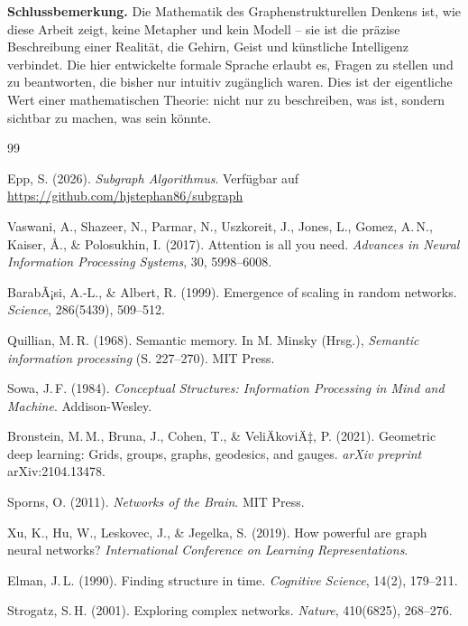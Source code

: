 ﻿\documentclass[12pt,a4paper]{article}
\theoremstyle{plain}
\theoremstyle{definition}
\theoremstyle{remark}
\begin{document}
\textbf{Schlussbemerkung.} Die Mathematik des Graphenstrukturellen Denkens ist, wie diese Arbeit zeigt, keine Metapher und kein Modell -- sie ist die präzise Beschreibung einer Realität, die Gehirn, Geist und künstliche Intelligenz verbindet. Die hier entwickelte formale Sprache erlaubt es, Fragen zu stellen und zu beantworten, die bisher nur intuitiv zugänglich waren. Dies ist der eigentliche Wert einer mathematischen Theorie: nicht nur zu beschreiben, was ist, sondern sichtbar zu machen, was sein könnte.

\begin{thebibliography}{99}

Epp, S. (2026).
\textit{Subgraph Algorithmus}. Verfügbar auf \url{https://github.com/hjstephan86/subgraph}

Vaswani, A., Shazeer, N., Parmar, N., Uszkoreit, J., Jones, L., Gomez, A.\,N., Kaiser, Å., \& Polosukhin, I. (2017).
Attention is all you need.
\textit{Advances in Neural Information Processing Systems}, 30, 5998--6008.

BarabÃ¡si, A.-L., \& Albert, R. (1999).
Emergence of scaling in random networks.
\textit{Science}, 286(5439), 509--512.

Quillian, M.\,R. (1968).
Semantic memory.
In M. Minsky (Hrsg.), \textit{Semantic information processing} (S. 227--270). MIT Press.

Sowa, J.\,F. (1984).
\textit{Conceptual Structures: Information Processing in Mind and Machine}. Addison-Wesley.

Bronstein, M.\,M., Bruna, J., Cohen, T., \& VeliÄkoviÄ‡, P. (2021).
Geometric deep learning: Grids, groups, graphs, geodesics, and gauges.
\textit{arXiv preprint} arXiv:2104.13478.

Sporns, O. (2011).
\textit{Networks of the Brain}. MIT Press.

Xu, K., Hu, W., Leskovec, J., \& Jegelka, S. (2019).
How powerful are graph neural networks?
\textit{International Conference on Learning Representations}.

Elman, J.\,L. (1990).
Finding structure in time.
\textit{Cognitive Science}, 14(2), 179--211.

Strogatz, S.\,H. (2001).
Exploring complex networks.
\textit{Nature}, 410(6825), 268--276.

\end{thebibliography}
\end{document}
